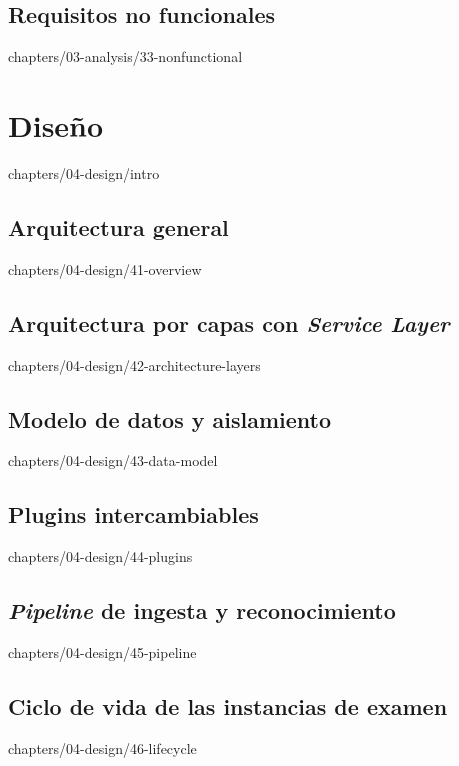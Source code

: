 \documentclass[epsbased,tfg,covers,final,printable,extendedindex,%
               firstnumbered,lof,lot, loc]{tfgtfmthesisuam}
\begin{document}
  \section{Requisitos no funcionales\label{SEC:ANALYSIS-RNF}}%
          {chapters/03-analysis/33-nonfunctional}


\chapter{Diseño\label{CAP:DESIGN}}{chapters/04-design/intro}
  \section{Arquitectura general\label{SEC:DES-OVERVIEW}}%
          {chapters/04-design/41-overview}
  \section[Arquitectura por capas]%
          {Arquitectura por capas con \textit{Service Layer}%
           \label{SEC:DES-LAYERS}}%
          {chapters/04-design/42-architecture-layers}
  \section[Modelo de datos y multi-tenant]%
          {Modelo de datos y aislamiento %
           \label{SEC:DES-DATA}}%
          {chapters/04-design/43-data-model}
  \section[Plugins intercambiables]%
          {Plugins intercambiables\label{SEC:DES-PLUGINS}}%
          {chapters/04-design/44-plugins}
  \section[Pipeline de ingesta y reconocimiento]%
          {\textit{Pipeline} de ingesta y reconocimiento%
           \label{SEC:DES-INGEST}}%
          {chapters/04-design/45-pipeline}
  \section[Ciclo de vida de las instancias]%
          {Ciclo de vida de las instancias de examen%
           \label{SEC:DES-LIFECYCLE}}%
          {chapters/04-design/46-lifecycle}
\end{document}
